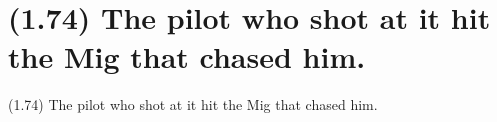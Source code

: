 \documentclass{article}
\begin{document}
\clearpage

%
%

\section*{(1.74) The pilot who shot at it hit the Mig that chased him.}

\bigbreak
\begin{enumerate*}
\item[(1.74)] The pilot who shot at it hit the Mig that chased him.
\end{enumerate*}
\bigbreak
\end{document}
